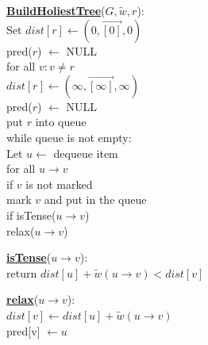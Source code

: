 \documentclass{article}
\begin{document}
\begin{minipage}[t]{0.58\linewidth}
\begin{algorithm}
\textbf{\underline{BuildHoliestTree}}($G, \tilde w , r$): \\ \quad
Set $dist[r] \leftarrow ( 0, \vec{[0]}, 0 )$ \\ \quad \quad
    pred($r$) $\leftarrow$ NULL \\ \quad
for all $v : v \neq r$ \\ \quad \quad
    $dist[r] \leftarrow ( \infty, \vec{[\infty]}, \infty )$ \\ \quad \quad
    pred($r$) $\leftarrow$ NULL \\ \quad
put $r$ into queue \\ \quad
while queue is not empty: \\ \quad \quad
    Let $u \leftarrow$ dequeue item \\ \quad \quad
    for all $u \rightarrow v$ \\ \qquad \quad
        if $v$ is not marked \\ \quad \qquad \quad
           mark $v$ and put in the queue \\ \qquad \quad
        if isTense($u \rightarrow v$) \\ \quad \qquad \quad
           relax($u \rightarrow v$)
\end{algorithm}
\end{minipage}
\hfill%
\hspace{-4cm}
\begin{minipage}[t]{0.38\linewidth}
\begin{algorithm}
\textbf{\underline{isTense}}($u \rightarrow v$): \\ \quad
return $dist[u] + \tilde w(u \rightarrow v) < dist[v]$ \\

\end{algorithm}

\vspace{0.5cm}

\begin{algorithm}
\textbf{\underline{relax}}($u \rightarrow v$): \\ \quad
$dist[v] \leftarrow dist[u] + \tilde w(u \rightarrow v)$ \\ \quad
pred[v] $\leftarrow u$ \\
\end{algorithm}
\end{minipage}

\vspace{0.5cm}
\end{document}
